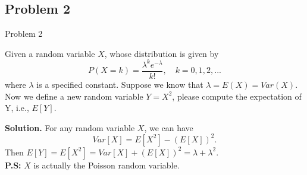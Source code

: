 \documentclass{beamer}
\begin{document}
\subsection{Problem 2}
\begin{frame}{Problem 2}
\begin{block}{}
Given a random variable $X$, whose distribution is given by
$$P(X=k)= \frac{\lambda^ke^{-\lambda}}{k!}, \quad k = 0,1,2,...$$
where $\lambda$ is a specified constant. Suppose we know that $\lambda = E(X) = Var(X)$. Now we define a new random variable $Y = X^2$, please compute the expectation of Y, i.e., $E[Y]$.\\
\end{block}
\textbf{Solution.} For any random variable $X$, we can have $$Var[X] = E[X^2]-(E[X])^2.$$
Then $E[Y] = E[X^2] = Var[X]+(E[X])^2 = \lambda +\lambda^2.$\\
\vspace{0.2cm}
\textbf{P.S: }$X$ is actually the Poisson random variable.
\end{frame}
\end{document}
